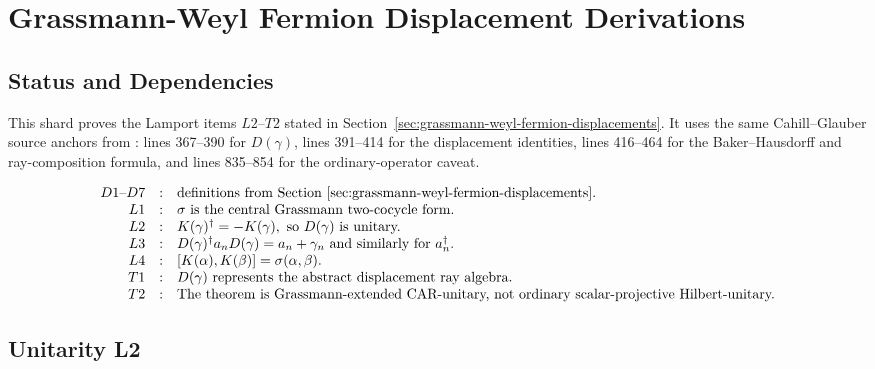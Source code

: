 
\section{Grassmann-Weyl Fermion Displacement Derivations}
\label{sec:grassmann-weyl-fermion-displacement-derivations}

\subsection{Status and Dependencies}

This shard proves the Lamport items \(L2\)--\(T2\) stated in
Section~\ref{sec:grassmann-weyl-fermion-displacements}.  It uses the same
Cahill--Glauber source anchors from
:
lines 367--390 for \(D(\gamma)\), lines 391--414 for the displacement
identities, lines 416--464 for the Baker--Hausdorff and ray-composition
formula, and lines 835--854 for the ordinary-operator caveat.

\[
\begin{array}{rcl}
D1\text{--}D7&:&\text{definitions from Section }
  \ref{sec:grassmann-weyl-fermion-displacements}.\\
L1&:&\sigma\text{ is the central Grassmann two-cocycle form.}\\
L2&:&K(\gamma)^\dagger=-K(\gamma),\text{ so }D(\gamma)\text{ is unitary.}\\
L3&:&D(\gamma)^\dagger a_nD(\gamma)=a_n+\gamma_n
      \text{ and similarly for }a_n^\dagger.\\
L4&:&[K(\alpha),K(\beta)]=\sigma(\alpha,\beta).\\
T1&:&D(\gamma)\text{ represents the abstract displacement ray algebra.}\\
T2&:&\text{The theorem is Grassmann-extended CAR-unitary, not ordinary
      scalar-projective Hilbert-unitary.}
\end{array}
\]

\subsection{Unitarity L2}

